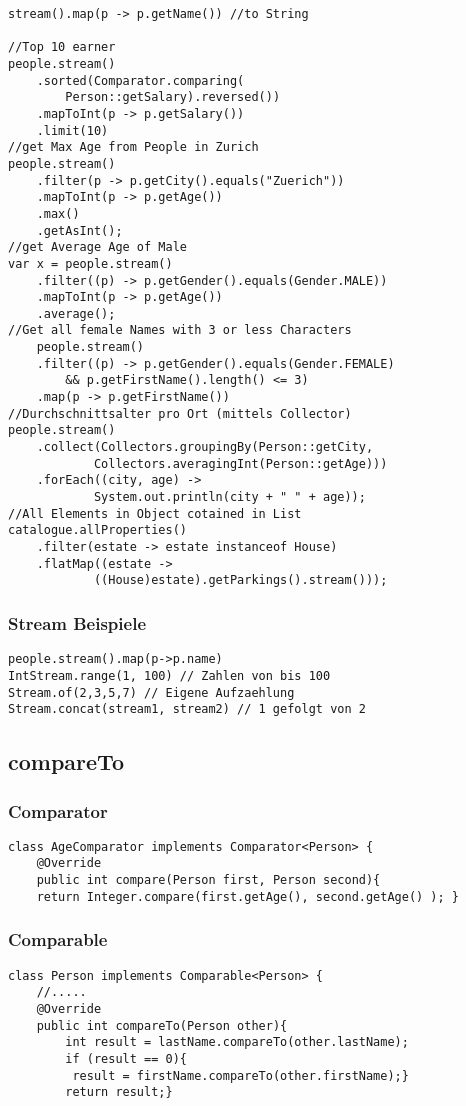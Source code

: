 \begin{multicols*}{5}
\begin{lstlisting}
stream().map(p -> p.getName()) //to String

//Top 10 earner
people.stream()
	.sorted(Comparator.comparing(
		Person::getSalary).reversed())
	.mapToInt(p -> p.getSalary())
	.limit(10)
//get Max Age from People in Zurich
people.stream()
	.filter(p -> p.getCity().equals("Zuerich"))
	.mapToInt(p -> p.getAge())
	.max()
	.getAsInt();
//get Average Age of Male
var x = people.stream()
	.filter((p) -> p.getGender().equals(Gender.MALE))
	.mapToInt(p -> p.getAge())
	.average();
//Get all female Names with 3 or less Characters
	people.stream()
	.filter((p) -> p.getGender().equals(Gender.FEMALE) 
		&& p.getFirstName().length() <= 3)
	.map(p -> p.getFirstName())
//Durchschnittsalter pro Ort (mittels Collector)
people.stream()
	.collect(Collectors.groupingBy(Person::getCity, 
			Collectors.averagingInt(Person::getAge)))
	.forEach((city, age) -> 
			System.out.println(city + " " + age));
//All Elements in Object cotained in List
catalogue.allProperties()
	.filter(estate -> estate instanceof House)
	.flatMap((estate -> 
			((House)estate).getParkings().stream()));
	\end{lstlisting}

	\vspace{30pt}

	\subsubsection{Stream Beispiele}
		\begin{lstlisting}
people.stream().map(p->p.name)
IntStream.range(1, 100) // Zahlen von bis 100
Stream.of(2,3,5,7) // Eigene Aufzaehlung
Stream.concat(stream1, stream2) // 1 gefolgt von 2
		\end{lstlisting}


	
	\subsection{compareTo}
	\subsubsection{Comparator}
		\begin{lstlisting}
class AgeComparator implements Comparator<Person> {
	@Override
	public int compare(Person first, Person second){
	return Integer.compare(first.getAge(), second.getAge() ); }
		\end{lstlisting}
	\subsubsection{Comparable}
		\begin{lstlisting}
class Person implements Comparable<Person> {
	//.....
	@Override
	public int compareTo(Person other){
		int result = lastName.compareTo(other.lastName);
		if (result == 0){ 
		 result = firstName.compareTo(other.firstName);}
		return result;}
		\end{lstlisting}

\end{multicols*}
